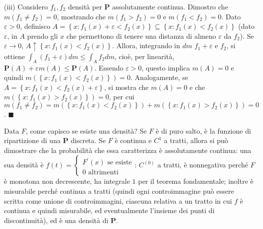 \documentclass{article}
\begin{document}
(iii) Considero $f_{1},f_{2}$ densit\`{a} per $\mathbf{P}$ assolutamente
continua. Dimostro che $m\left( f_{1}\neq f_{2}\right) =0$, mostrando che $%
m\left( f_{1}>f_{2}\right) =0$ e $m\left( f_{1}<f_{2}\right) =0$. Dato $%
\varepsilon >0$, definisco $A=\left\{ x:f_{1}\left( x\right) +\varepsilon
<f_{2}\left( x\right) \right\} \subseteq \left\{ x:f_{1}\left( x\right)
<f_{2}\left( x\right) \right\} $ (dato $\varepsilon $, in $A$ prendo gli $x$
che permettono di tenere una distanza di almeno $\varepsilon $ da $f_{2}$).
Se $\varepsilon \rightarrow 0$, $A\uparrow \left\{ x:f_{1}\left( x\right)
<f_{2}\left( x\right) \right\} $. Allora, integrando in $dm$ $%
f_{1}+\varepsilon $ e $f_{2}$, si ottiene $\int_{A}\left( f_{1}+\varepsilon
\right) dm\leq \int_{A}f_{2}dm$, cio\`{e}, per linearit\`{a}, $\mathbf{P}%
\left( A\right) +\varepsilon m\left( A\right) \leq \mathbf{P}\left( A\right) 
$. Essendo $\varepsilon >0$, questo implica $m\left( A\right) =0$ e quindi $%
m\left( \left\{ x:f_{1}\left( x\right) <f_{2}\left( x\right) \right\}
\right) =0$. Analogamente, se $A=\left\{ x:f_{1}\left( x\right) <f_{2}\left(
x\right) +\varepsilon \right\} $, si mostra che $m\left( A\right) =0$ e che $%
m\left( \left\{ x:f_{1}\left( x\right) >f_{2}\left( x\right) \right\}
\right) =0$, per cui $m\left( f_{1}\neq f_{2}\right) =m\left( \left\{
x:f_{1}\left( x\right) <f_{2}\left( x\right) \right\} \right) +m\left(
\left\{ x:f_{1}\left( x\right) >f_{2}\left( x\right) \right\} \right) =0$. $%
\blacksquare $

Data $F$, come capisco se esiste una densit\`{a}? Se $F$ \`{e} di puro
salto, \`{e} la funzione di ripartizione di una $\mathbf{P}$ discreta. Se $F$
\`{e} continua e $C^{1}$ a tratti, allora si pu\`{o} dimostrare che la
probabilit\`{a} che essa caratterizza \`{e} assolutamente continua: una sua
densit\`{a} \`{e} $f\left( t\right) =\left\{ 
\begin{array}{c}
F^{\prime }\left( x\right) \text{ se esiste} \\ 
0\text{ altrimenti}%
\end{array}%
\right. $: $C^{\left( 0\right) }$ a tratti, \`{e} nonnegativa perch\'{e} $F$ 
\`{e} monotona non decrescente, ha integrale $1$ per il teorema
fondamentale; inoltre \`{e} misurabile perch\'{e} continua a tratti (quindi
ogni controimmagine pu\`{o} essere scritta come unione di controimmagini,
ciascuna relativa a un tratto in cui $f$ \`{e} continua e quindi misurabile,
ed eventualmente l'insieme dei punti di discontinuit\`{a}), ed \`{e} una
densit\`{a} di $\mathbf{P}$.
\end{document}
